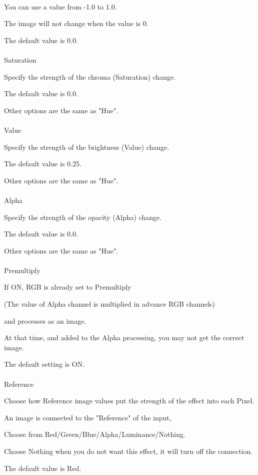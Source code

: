 \documentclass[a4paper,12pt]{article}
\begin{document}
\ \vspace{-0.2em}
\par
You can use a value from -1.0 to 1.0.\par
The image will not change when the value is 0.\par
The default value is 0.0.\\
\\
Saturation\par
Specify the strength of the chroma (Saturation) change.\par
The default value is 0.0.\par
Other options are the same as "Hue".\\
\\
Value\par
Specify the strength of the brightness (Value) change.\par
The default value is 0.25.\par
Other options are the same as "Hue".\\
\\
Alpha\par
Specify the strength of the opacity (Alpha) change.\par
The default value is 0.0.\par
Other options are the same as "Hue".\\
\\
Premultiply\par
If ON, RGB is already set to Premultiply\par
(The value of Alpha channel is multiplied in advance RGB channels)\par
and processes as an image.\par
At that time, and added to the Alpha processing, you may not get the correct image.\par
The default setting is ON.\\
\\
Reference\par
Choose how Reference image values put the strength of the effect into each Pixel.\par
An image is connected to the "Reference" of the input,\par
Choose from Red/Green/Blue/Alpha/Luminance/Nothing.\par
Choose Nothing when you do not want this effect, it will turn off the connection.\par
The default value is Red.
\end{document}
